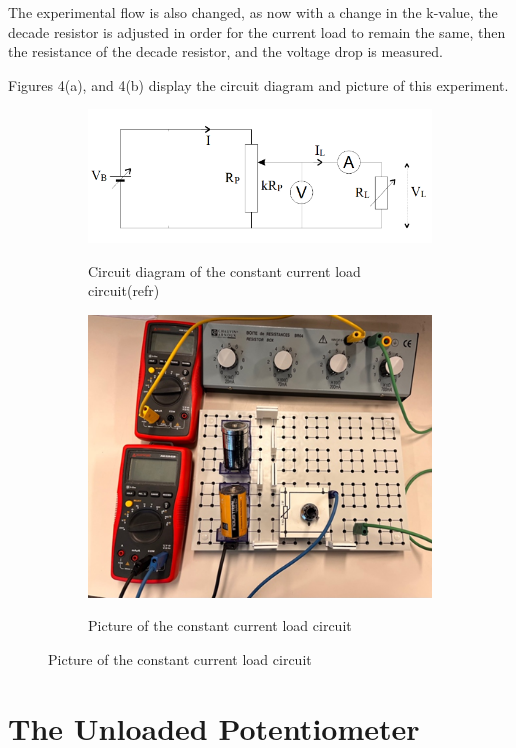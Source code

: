 \documentclass[a4paper]{article}
\begin{document}
The experimental flow is also changed, as now with a change in the k-value, the
decade resistor is adjusted in order for the current load to remain the same,
then the resistance of the decade resistor, and the voltage drop is measured.

Figures 4(a), and 4(b) display the circuit diagram and picture of this
experiment.

\begin{figure}[!ht]
    \centering
    \begin{subfigure}{.5\textwidth}
        \centering
        \includegraphics[width = 0.8\linewidth]{fixed current circuit.png}
        \label{fig:4a}
        \caption{Circuit diagram of the constant current load circuit(refr)}
        
    \end{subfigure}%
    \begin{subfigure}{.5\textwidth}
        \centering
        \includegraphics[width = 0.8\linewidth]{fixed currrent picture.png}
        \label{fig:4b}
        \caption{Picture of the constant current load circuit}
    \end{subfigure}
\end{figure}
\section{The Unloaded Potentiometer}
\end{document}
